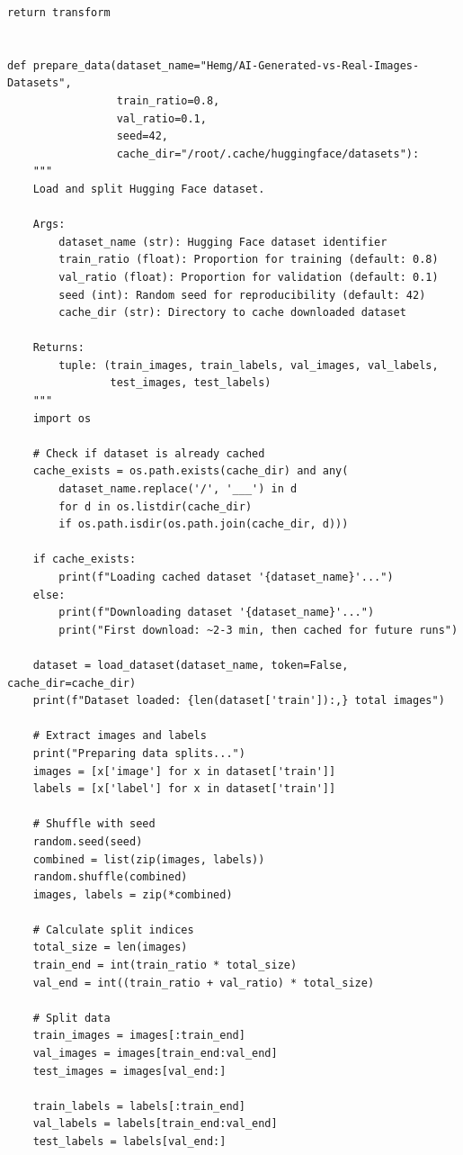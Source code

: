 \documentclass[man,12pt,letterpaper,donotrepeattitle,floatsintext]{apa7}
\begin{document}
\begin{lstlisting}[style=pythonstyle]
    return transform


def prepare_data(dataset_name="Hemg/AI-Generated-vs-Real-Images-Datasets",
                 train_ratio=0.8,
                 val_ratio=0.1,
                 seed=42,
                 cache_dir="/root/.cache/huggingface/datasets"):
    """
    Load and split Hugging Face dataset.
    
    Args:
        dataset_name (str): Hugging Face dataset identifier
        train_ratio (float): Proportion for training (default: 0.8)
        val_ratio (float): Proportion for validation (default: 0.1)
        seed (int): Random seed for reproducibility (default: 42)
        cache_dir (str): Directory to cache downloaded dataset
    
    Returns:
        tuple: (train_images, train_labels, val_images, val_labels, 
                test_images, test_labels)
    """
    import os
    
    # Check if dataset is already cached
    cache_exists = os.path.exists(cache_dir) and any(
        dataset_name.replace('/', '___') in d 
        for d in os.listdir(cache_dir) 
        if os.path.isdir(os.path.join(cache_dir, d)))
    
    if cache_exists:
        print(f"Loading cached dataset '{dataset_name}'...")
    else:
        print(f"Downloading dataset '{dataset_name}'...")
        print("First download: ~2-3 min, then cached for future runs")
    
    dataset = load_dataset(dataset_name, token=False, cache_dir=cache_dir)
    print(f"Dataset loaded: {len(dataset['train']):,} total images")
    
    # Extract images and labels
    print("Preparing data splits...")
    images = [x['image'] for x in dataset['train']]
    labels = [x['label'] for x in dataset['train']]
    
    # Shuffle with seed
    random.seed(seed)
    combined = list(zip(images, labels))
    random.shuffle(combined)
    images, labels = zip(*combined)
    
    # Calculate split indices
    total_size = len(images)
    train_end = int(train_ratio * total_size)
    val_end = int((train_ratio + val_ratio) * total_size)
    
    # Split data
    train_images = images[:train_end]
    val_images = images[train_end:val_end]
    test_images = images[val_end:]
    
    train_labels = labels[:train_end]
    val_labels = labels[train_end:val_end]
    test_labels = labels[val_end:]
    

\end{lstlisting}
\end{document}

